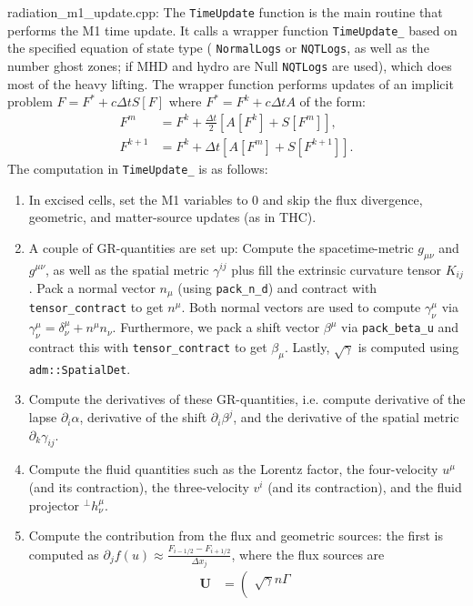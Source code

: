 \documentclass{article}
\newcommand{\var}[1]{%
  {\setlength{\fboxsep}{1.5pt}%
   \colorbox{varbg}{\textcolor{varfg}{\texttt{\small #1}}}}}
\begin{document}
{\color{gray}radiation\_m1\_update.cpp:} The \var{TimeUpdate} function is the main routine that performs the M1 time update. It calls a wrapper function \var{TimeUpdate\_} based on the specified equation of state type
(\var{NormalLogs} or \var{NQTLogs}, as well as the number ghost zones; if MHD and hydro are Null \var{NQTLogs} are used), which does most of the heavy lifting. The wrapper function performs updates of an implicit problem
$F=F^*+c\Delta tS[F]$ where $F^*=F^k+c\Delta t A$ of the form:
\begin{align}
  F^m&=F^k+\frac{\Delta t}{2}[A[F^k]+S[F^m]],\\
  F^{k+1}&=F^k+\Delta t[A[F^m]+S[F^{k+1}]].
\end{align}
The computation in \var{TimeUpdate\_} is as follows:
\begin{enumerate}
  \item In excised cells, set the M1 variables to 0 and skip the flux divergence, geometric, and matter-source updates (as in THC).
  \item A couple of GR-quantities are set up: Compute the spacetime-metric $g_{\mu\nu}$ and $g^{\mu\nu}$, as well as the spatial metric $\gamma^{ij}$ plus fill the extrinsic curvature tensor $K_{ij}$.
  Pack a normal vector $n_{\mu}$ (using \var{pack\_n\_d}) and contract with \var{tensor\_contract} to get $n^{\mu}$. Both normal vectors are used to compute $\gamma^{\mu}_{\nu}$ via
  $\gamma^{\mu}_{\nu}=\delta^{\mu}_{\nu}+n^{\mu}n_{\nu}$. Furthermore, we pack a shift vector $\beta^{\mu}$ via \var{pack\_beta\_u} and contract this with \var{tensor\_contract} to get
  $\beta_{\mu}$. Lastly, $\sqrt{\gamma}$ is computed using \var{adm::SpatialDet}.
  \item Compute the derivatives of these GR-quantities, i.e. compute derivative of the lapse $\partial_i\alpha$, derivative of the shift $\partial_i\beta^j$, and
  the derivative of the spatial metric $\partial_k\gamma_{ij}$.
  \item Compute the fluid quantities such as the Lorentz factor, the four-velocity $u^{\mu}$ (and its contraction), the three-velocity $v^i$ (and its contraction), and
  the fluid projector $^{\perp}h^{\mu}_{\nu}$.
  \item Compute the contribution from the flux and geometric sources: the first is computed as $\partial_jf(u)\approx \frac{F_{i-1/2}-F_{i+1/2}}{\Delta x_j}$, where the flux sources are
  \begin{align}
    \mathbf{U}&=\left(\begin{array}{c}
      \sqrt{\gamma}n\Gamma\\

\end{array}
\end{align}
\end{enumerate}
\end{document}
